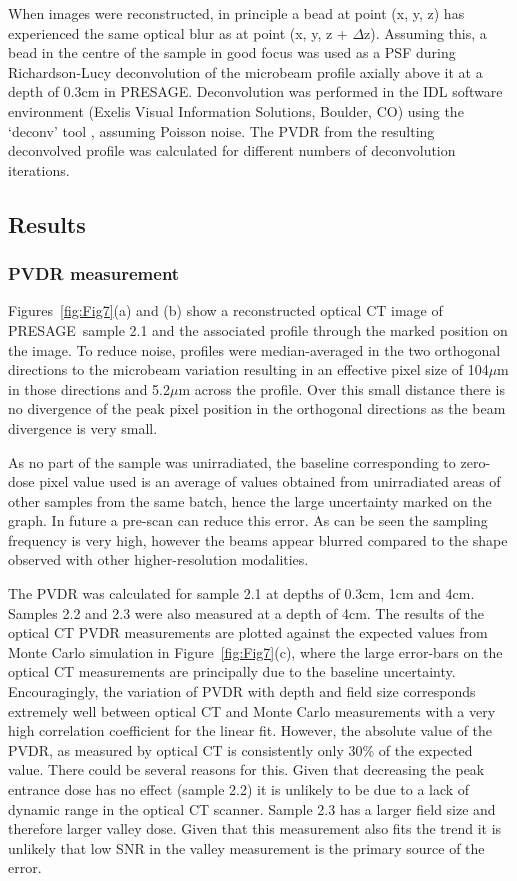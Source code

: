 	When images were reconstructed, in principle a bead at point (x, y, z) has experienced the same optical blur as at point (x, y, z + $\Delta $z). Assuming this, a bead in the centre of the sample in good focus was used as a PSF during Richardson-Lucy deconvolution of the microbeam profile axially above it at a depth of 0.3cm in PRESAGE\textregistered. Deconvolution was performed in the IDL software environment (Exelis Visual Information Solutions, Boulder, CO) using the `deconv' tool \cite{varosi1993idl}, assuming Poisson noise. The PVDR from the resulting deconvolved profile was calculated for different numbers of deconvolution iterations.
	
	\subsection{Results}

	
	\subsubsection{PVDR measurement} 
	Figures~\ref{fig:Fig7}(a) and (b) show a reconstructed optical CT image of PRESAGE\textregistered \ sample 2.1 and the associated profile through the marked position on the image. To reduce noise, profiles were median-averaged in the two orthogonal directions to the microbeam variation resulting in an effective pixel size of 104$\mu$m in those directions and 5.2$\mu$m across the profile. Over this small distance there is no divergence of the peak pixel position in the orthogonal directions as the beam divergence is very small. 
	
	As no part of the sample was unirradiated, the baseline corresponding to zero-dose pixel value used is an average of values obtained from unirradiated areas of other samples from the same batch, hence the large uncertainty marked on the graph. In future a pre-scan can reduce this error. As can be seen the sampling frequency is very high, however the beams appear blurred compared to the shape observed with other higher-resolution modalities. 
	
	The PVDR was calculated for sample 2.1 at depths of 0.3cm, 1cm and 4cm. Samples 2.2 and 2.3 were also measured at a depth of 4cm. The results of the optical CT PVDR measurements are plotted against the expected values from Monte Carlo simulation \cite{martinez-roviradevelopment2012} in Figure~\ref{fig:Fig7}(c), where the large error-bars on the optical CT measurements are principally due to the baseline uncertainty. Encouragingly, the variation of PVDR with depth and field size corresponds extremely well between optical CT and Monte Carlo measurements with a very high correlation coefficient for the linear fit. However, the absolute value of the PVDR, as measured by optical CT is consistently only 30\% of the expected value. There could be several reasons for this. Given that decreasing the peak entrance dose has no effect (sample 2.2) it is unlikely to be due to a lack of dynamic range in the optical CT scanner. Sample 2.3 has a larger field size and therefore larger valley dose. Given that this measurement also fits the trend it is unlikely that low SNR in the valley measurement is the primary source of the error. 
	
